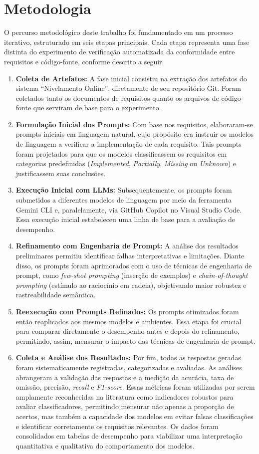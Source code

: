 \section{Metodologia}

O percurso metodológico deste trabalho foi fundamentado em um processo iterativo, estruturado em seis etapas principais. Cada etapa representa uma fase distinta do experimento de verificação automatizada da conformidade entre requisitos e código-fonte, conforme descrito a seguir. 

\begin{enumerate}
    \item \textbf{Coleta de Artefatos:} A fase inicial consistiu na extração dos artefatos do sistema “Nivelamento Online”, diretamente de seu repositório Git. Foram coletados tanto os documentos de requisitos quanto os arquivos de código-fonte que serviram de base para o experimento. 
    \item \textbf{Formulação Inicial dos Prompts:} Com base nos requisitos, elaboraram-se prompts iniciais em linguagem natural, cujo propósito era instruir os modelos de linguagem a verificar a implementação de cada requisito. Tais prompts foram projetados para que os modelos classificassem os requisitos em categorias predefinidas (\textit{Implemented}, \textit{Partially}, \textit{Missing} ou \textit{Unknown}) e justificassem suas conclusões. 
    \item \textbf{Execução Inicial com LLMs:} Subsequentemente, os prompts foram submetidos a diferentes modelos de linguagem por meio da ferramenta Gemini CLI e, paralelamente, via GitHub Copilot no Visual Studio Code. Essa execução inicial estabeleceu uma linha de base para a avaliação de desempenho. 
    \item \textbf{Refinamento com Engenharia de Prompt:} A análise dos resultados preliminares permitiu identificar falhas interpretativas e limitações. Diante disso, os prompts foram aprimorados com o uso de técnicas de engenharia de prompt, como \textit{few-shot prompting} (inserção de exemplos) e \textit{chain-of-thought prompting} (estímulo ao raciocínio em cadeia), objetivando maior robustez e rastreabilidade semântica. 
    \item \textbf{Reexecução com Prompts Refinados:} Os prompts otimizados foram então reaplicados aos mesmos modelos e ambientes. Essa etapa foi crucial para comparar diretamente o desempenho antes e depois do refinamento, permitindo, assim, mensurar o impacto das técnicas de engenharia de prompt. 
    \item \textbf{Coleta e Análise dos Resultados:} Por fim, todas as respostas geradas foram sistematicamente registradas, categorizadas e avaliadas. As análises abrangeram a validação das respostas e a medição da acurácia, taxa de omissão, precisão, \textit{recall} e \textit{F1-score}. Essas métricas foram utilizadas por serem amplamente reconhecidas na literatura como indicadores robustos para avaliar classificadores, permitindo mensurar não apenas a proporção de acertos, mas também a capacidade dos modelos em evitar falsas classificações e identificar corretamente os requisitos relevantes. Os dados foram consolidados em tabelas de desempenho para viabilizar uma interpretação quantitativa e qualitativa do comportamento dos modelos.

\end{enumerate}
